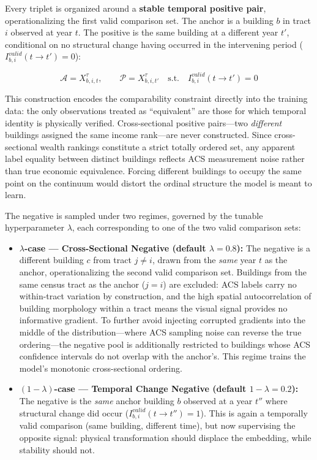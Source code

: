 \documentclass{article}
\begin{document}
Every triplet is organized around a \textbf{stable temporal positive pair}, operationalizing the first valid comparison set. The anchor is a building $b$ in tract $i$ observed at year $t$. The positive is the same building at a different year $t'$, conditional on no structural change having occurred in the intervening period ($I_{b,i}^{valid}(t \to t') = 0$):

\begin{equation}
\mathcal{A} = X_{b,i,t}^\tau, \qquad \mathcal{P} = X_{b,i,t'}^\tau \quad \text{s.t.} \quad I_{b,i}^{valid}(t \to t') = 0
\end{equation}

This construction encodes the comparability constraint directly into the training data: the only observations treated as ``equivalent'' are those for which temporal identity is physically verified. Cross-sectional positive pairs---two \textit{different} buildings assigned the same income rank---are never constructed. Since cross-sectional wealth rankings constitute a strict totally ordered set, any apparent label equality between distinct buildings reflects ACS measurement noise rather than true economic equivalence. Forcing different buildings to occupy the same point on the continuum would distort the ordinal structure the model is meant to learn.

The negative is sampled under two regimes, governed by the tunable hyperparameter $\lambda$, each corresponding to one of the two valid comparison sets:

\begin{itemize}
    \item \textbf{$\lambda$-case --- Cross-Sectional Negative (default $\lambda = 0.8$):} The negative is a different building $c$ from tract $j \neq i$, drawn from the \textit{same} year $t$ as the anchor, operationalizing the second valid comparison set. Buildings from the same census tract as the anchor ($j = i$) are excluded: ACS labels carry no within-tract variation by construction, and the high spatial autocorrelation of building morphology within a tract means the visual signal provides no informative gradient. To further avoid injecting corrupted gradients into the middle of the distribution---where ACS sampling noise can reverse the true ordering---the negative pool is additionally restricted to buildings whose ACS confidence intervals do not overlap with the anchor's. This regime trains the model's monotonic cross-sectional ordering.

    \item \textbf{$(1-\lambda)$-case --- Temporal Change Negative (default $1 - \lambda = 0.2$):} The negative is the \textit{same} anchor building $b$ observed at a year $t''$ where structural change did occur ($I_{b,i}^{valid}(t \to t'') = 1$). This is again a temporally valid comparison (same building, different time), but now supervising the opposite signal: physical transformation should displace the embedding, while stability should not.
\end{itemize}
\end{document}
